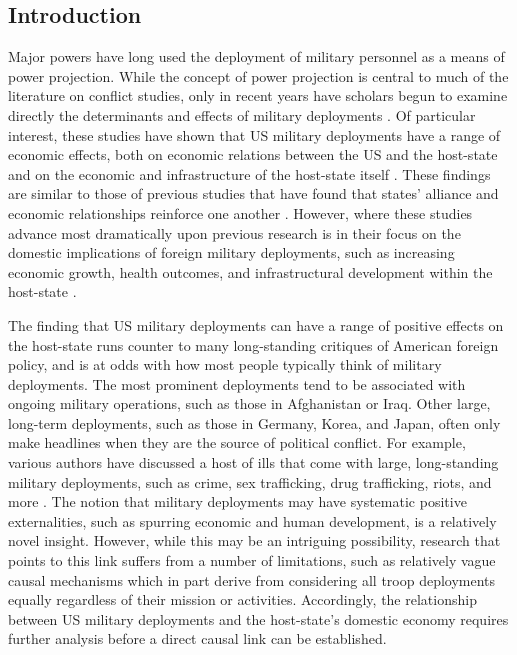 \documentclass[12pt]{article}
\begin{document}
\begin{doublespace}


\section{Introduction}

Major powers have long used the deployment of military personnel as a means of power projection. While the concept of power projection is central to much of the literature on conflict studies, only in recent years have scholars begun to examine directly the determinants and effects of military deployments \cite{biglaiser2007following,kane2012development,jones2012us,MMM2013,AllenFlynn2013,Allenetal2014,Allenetal2016,Braithwaite2015,Allenetal:2016apsa}. Of particular interest, these studies have shown that US military deployments have a range of economic effects, both on economic relations between the US and the host-state \cite{biglaiser2007following,biglaiser2009interdependence} and on the economic and infrastructure of the host-state itself \cite{kane2012development,jones2012us}. These findings are similar to those of previous studies that have found that states' alliance and economic relationships reinforce one another \cite{GowaMansfield1993,GowaMansfield2004,Fordham2008}. However, where these studies advance most dramatically upon previous research is in their focus on the domestic implications of foreign military deployments, such as increasing economic growth, health outcomes, and infrastructural development within the host-state \cite{jones2012us,kane2012development}.

The finding that US military deployments can have a range of positive effects on the host-state runs counter to many long-standing critiques of American foreign policy, and is at odds with how most people typically think of military deployments. The most prominent deployments tend to be associated with ongoing military operations, such as those in Afghanistan or Iraq. Other large, long-term deployments, such as those in Germany, Korea, and Japan, often only make headlines when they are the source of political conflict. For example, various authors have discussed a host of ills that come with large, long-standing military deployments, such as crime, sex trafficking, drug trafficking, riots, and more . The notion that military deployments may have systematic positive externalities, such as spurring economic and human development, is a relatively novel insight. However, while this may be an intriguing possibility, research that points to this link suffers from a number of limitations, such as relatively vague causal mechanisms which in part derive from considering all troop deployments equally regardless of their mission or activities. Accordingly, the relationship between US military deployments and the host-state's domestic economy requires further analysis before a direct causal link can be established.


\end{doublespace}
\end{document}
